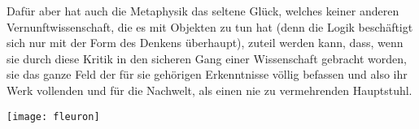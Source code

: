 Daf\"ur aber hat
auch die Metaphysik das seltene Gl\"uck, welches keiner anderen
Vernunftwissenschaft, die es mit Objekten zu tun hat (denn die Logik
besch\"aftigt sich nur mit der Form des Denkens \"uberhaupt), zuteil
werden kann, dass, wenn sie durch diese Kritik in den sicheren Gang
einer Wissenschaft gebracht worden, sie das ganze Feld der f\"ur sie
geh\"origen Erkenntnisse v\"ollig befassen und also ihr Werk vollenden
und f\"ur die Nachwelt, als einen nie zu vermehrenden Hauptstuhl.



\clearpage
\thispagestyle{empty}
\vspace*{30mm}
\begin{center}
\texttt{[image: fleuron]}
\end{center}
\clearpage


